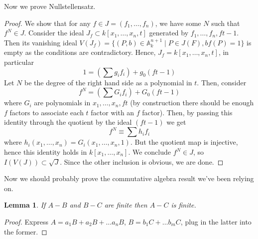 \documentclass[12pt]{article}
\newcommand{\A}{\mathbb{A}}
\newtheorem{lemma}{Lemma}[section]
\begin{document}
    Now we prove Nullstellensatz.
    \begin{proof}
        We show that for any $f \in J = (f_1, \dots, f_n)$, we have some $N$ such that $f^N \in J$. Consider the ideal $J_f \subset k[x_1, \dots, x_n, t]$ generated by $f_1, \dots, f_n, ft - 1$. Then its vanishing ideal $V(J_f) = \{(P, b) \in \A^{n+1}_k \mid P \in J(F), bf(P) = 1\}$ is empty as the conditions are contradictory. Hence, $J_f = k[x_1, \dots, x_n, t]$, in particular
        $$1 = \left(\sum g_if_i\right) + g_{0}(ft - 1)$$
        Let $N$ be the degree of the right hand side as a polynomial in $t$. Then, consider
        $$f^N = \left(\sum G_if_i \right) + G_0(ft - 1)$$
        where $G_i$ are polynomials in $x_1, \dots, x_n, ft$ (by construction there should be enough $f$ factors to associate each $t$ factor with an $f$ factor). Then, by passing this identity through the quotient by the ideal $(ft - 1)$ we get
        $$f^N \equiv \sum h_i f_i$$
        where $h_i(x_1, \dots, x_n) = G_i(x_1, \dots, x_n, 1)$. But the quotient map is injective, hence this identity holds in $k[x_1, \dots, x_n]$. We conclude $f^N \in J$, so $I(V(J)) \subset \sqrt{J}$. Since the other inclusion is obvious, we are done.
    \end{proof}
    Now we should probably prove the commutative algebra result we've been relying on.
    \begin{lemma}
        If $A - B$ and $B - C$ are finite then $A - C$ is finite.
    \end{lemma}
    \begin{proof}
        Express $A = a_1B + a_2B + \dots a_nB$, $B = b_1C + \dots b_mC$, plug in the latter into the former.
    \end{proof}
\end{document}
